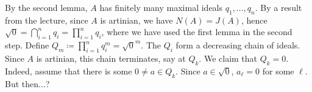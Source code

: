 By the second lemma, $A$ has finitely many maximal ideals $q_1, \ldots, q_n$.
By a result from the lecture, since $A$ is artinian, we have $N(A) = J(A)$, hence
$\sqrt{0} = \bigcap_{i = 1}^n q_i = \prod_{i = 1}^n q_i$, where we have used the
first lemma in the second step. Define $Q_m\coloneqq \prod_{i = 1}^n q_i^m = \sqrt{0}^m$.
The $Q_i$ form a decreasing chain of ideals. Since $A$ is artinian, this chain
terminates, say at $Q_k$. We claim that $Q_k = 0$. Indeed, assume that there
is some $0\neq a \in Q_k$. Since $a \in \sqrt{0}$, $a_\ell = 0$ for some $\ell$.
But then...?
